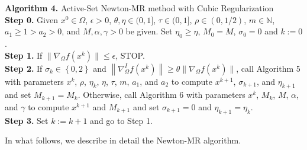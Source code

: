 \documentclass[11pt]{article}
\begin{document}
\begin{mdframed}
\noindent\textbf{Algorithm 4.} Active-Set Newton-MR method with Cubic Regularization
\\[0.1cm]
\noindent\textbf{Step 0.} Given $x^{0}\in\Omega$, $\epsilon>0$, $\theta,\eta\in (0,1]$, $\tau \in (0,1]$, $\rho\in (0,1/2)$, $m\in\mathbb{N}$, $a_{1}\geq 1>a_{2}>0$, and $M,\alpha,\gamma>0$ be given. Set $\eta_{0} \geq \eta$, $M_{0}=M$, $\sigma_{0}=0$ and $k:=0$.
\\[0.1cm]
\noindent\textbf{Step 1.} If $\|\nabla_{\Omega}f(x^{k})\|\leq \epsilon$, STOP.
\\[0.1cm]
\noindent\textbf{Step 2.} If $\sigma_{k}\in\left\{0,2\right\}$ and $\left\|\nabla_{\Omega}^{I}f(x^{k})\right\|\geq \theta\|\nabla_{\Omega}f(x^{k})\|$, call Algorithm 5 with parameters $x^{k}$, $\rho$, $\eta_{k}$, $\eta$, $\tau$, $m$, $a_1$, and $a_2$ to compute $x^{k+1}$, $\sigma_{k+1}$, and $\eta_{k+1}$ and set $M_{k+1}=M_{k}$. Otherwise, call Algorithm 6 with parameters $x^{k}$, $M_{k}$, $M$, $\alpha$, and $\gamma$ to compute $x^{k+1}$ and $M_{k+1}$ and set $\sigma_{k+1}=0$ and $\eta_{k+1}=\eta_{k}$.
\\[0.1cm]
\noindent\textbf{Step 3.} Set $k:=k+1$ and go to Step 1.
\end{mdframed}

In what follows, we describe in detail the Newton-MR algorithm.
\end{document}

